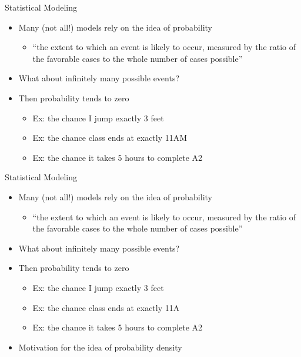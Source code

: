 \documentclass[aspectratio=169]{beamer}
\begin{document}
\begin{frame}{Statistical Modeling}

\begin{itemize}
\item Many (not all!) models rely on the idea of probability
	\begin{itemize}
		\item ``the extent to which an event is likely to occur, measured by the ratio of the favorable cases to the whole number of cases possible''
	\end{itemize}
\item What about infinitely many possible events?
\item Then probability tends to zero
	\begin{itemize}
		\item Ex: the chance I jump exactly 3 feet
		\item Ex: the chance class ends at exactly 11AM
		\item Ex: the chance it takes 5 hours to complete A2 
	\end{itemize}
\end{itemize}
\end{frame}
\begin{frame}{Statistical Modeling}

\begin{itemize}
\item Many (not all!) models rely on the idea of probability
	\begin{itemize}
		\item ``the extent to which an event is likely to occur, measured by the ratio of the favorable cases to the whole number of cases possible''
	\end{itemize}
\item What about infinitely many possible events?
\item Then probability tends to zero
	\begin{itemize}
		\item Ex: the chance I jump exactly 3 feet
		\item Ex: the chance class ends at exactly 11A
		\item Ex: the chance it takes 5 hours to complete A2 
	\end{itemize}
\item Motivation for the idea of probability density
\end{itemize}
\end{frame}
\end{document}
